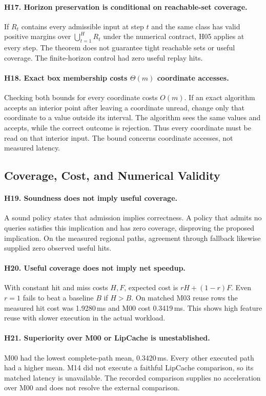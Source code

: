 \paragraph{H17. Horizon preservation is conditional on reachable-set coverage.}
If $R_t$ contains every admissible input at step $t$ and the same class has valid positive margins over $\bigcup_{t=1}^H R_t$ under the numerical contract, H05 applies at every step. The theorem does not guarantee tight reachable sets or useful coverage. The finite-horizon control had zero useful replay hits.

\paragraph{H18. Exact box membership costs $\Theta(m)$ coordinate accesses.}
Checking both bounds for every coordinate costs $O(m)$. If an exact algorithm accepts an interior point after leaving a coordinate unread, change only that coordinate to a value outside its interval. The algorithm sees the same values and accepts, while the correct outcome is rejection. Thus every coordinate must be read on that interior input. The bound concerns coordinate accesses, not measured latency.

\subsection{Coverage, Cost, and Numerical Validity}
\paragraph{H19. Soundness does not imply useful coverage.}
A sound policy states that admission implies correctness. A policy that admits no queries satisfies this implication and has zero coverage, disproving the proposed implication. On the measured regional paths, agreement through fallback likewise supplied zero observed useful hits.

\paragraph{H20. Useful coverage does not imply net speedup.}
With constant hit and miss costs $H,F$, expected cost is $rH+(1-r)F$. Even $r=1$ fails to beat a baseline $B$ if $H>B$. On matched M03 reuse rows the measured hit cost was 1.9280\,ms and M00 cost 0.3419\,ms. This shows high feature reuse with slower execution in the actual workload.

\paragraph{H21. Superiority over M00 or LipCache is unestablished.}
M00 had the lowest complete-path mean, 0.3420\,ms. Every other executed path had a higher mean. M14 did not execute a faithful LipCache comparison, so its matched latency is unavailable. The recorded comparison supplies no acceleration over M00 and does not resolve the external comparison.

